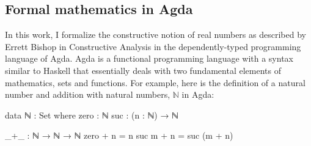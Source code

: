 \documentclass[11pt,a4paper]{article}
\begin{document}
\subsection{Formal mathematics in Agda}\label{subsec: Agda}
In this work, I formalize the constructive notion of real numbers as described by Errett Bishop in Constructive Analysis \cite{bishop:85} in the dependently-typed programming language of Agda. Agda is a functional programming language with a syntax similar to Haskell that essentially deals with two fundamental elements of mathematics, sets and functions. For example, here is the definition of a natural number and addition with natural numbers, $\mathbb{N}$ in Agda:\\

\begin{code}
data ℕ : Set where
  zero : ℕ
  suc  : (n : ℕ) → ℕ

_+_ : ℕ → ℕ → ℕ
zero  + n = n
suc m + n = suc (m + n)
\end{code}
\end{document}
